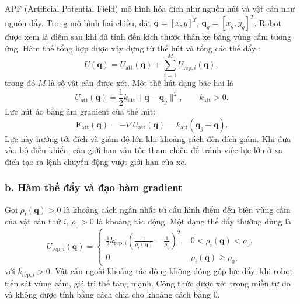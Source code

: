 \documentclass[12pt,a4paper,oneside]{report}
\begin{document}
APF (Artificial Potential Field) mô hình hóa đích như nguồn hút và vật cản như nguồn đẩy. Trong mô hình hai chiều, đặt \(\mathbf{q}=[x,y]^{T}\), \(\mathbf{q}_g=[x_g,y_g]^{T}\). Robot được xem là điểm sau khi đã tính đến kích thước thân xe bằng vùng cấm tương ứng. Hàm thế tổng hợp được xây dựng từ thế hút và tổng các thế đẩy \cite{khatib-apf-1986}:
\begin{equation}
  U(\mathbf{q})=U_{\mathrm{att}}(\mathbf{q})
    +\sum_{i=1}^{M}U_{\mathrm{rep},i}(\mathbf{q}),
  \label{eq:apf-potential}
\end{equation}
trong đó \(M\) là số vật cản được xét. Một thế hút dạng bậc hai là
\begin{equation}
  U_{\mathrm{att}}(\mathbf{q})
    =\frac{1}{2}k_{\mathrm{att}}\|\mathbf{q}-\mathbf{q}_g\|^{2},
  \qquad k_{\mathrm{att}}>0.
\end{equation}
Lực hút ảo bằng âm gradient của thế hút:
\begin{equation}
  \mathbf{F}_{\mathrm{att}}(\mathbf{q})
    =-\nabla U_{\mathrm{att}}(\mathbf{q})
    =k_{\mathrm{att}}(\mathbf{q}_g-\mathbf{q}).
  \label{eq:apf-attractive-force}
\end{equation}
Lực này hướng tới đích và giảm độ lớn khi khoảng cách đến đích giảm. Khi đưa vào bộ điều khiển, cần giới hạn vận tốc tham chiếu để tránh việc lực lớn ở xa đích tạo ra lệnh chuyển động vượt giới hạn của xe.

\subsubsection*{b. Hàm thế đẩy và đạo hàm gradient}

Gọi \(\rho_i(\mathbf{q})>0\) là khoảng cách ngắn nhất từ cấu hình điểm đến biên vùng cấm của vật cản thứ \(i\), \(\rho_0>0\) là khoảng tác động. Một dạng thế đẩy thường dùng là
\begin{equation}
  U_{\mathrm{rep},i}(\mathbf{q})=
  \begin{cases}
    \displaystyle\frac{1}{2}k_{\mathrm{rep},i}
      \left(\frac{1}{\rho_i(\mathbf{q})}-\frac{1}{\rho_0}\right)^{2},
      &0<\rho_i(\mathbf{q})<\rho_0,\\[6pt]
    0,&\rho_i(\mathbf{q})\geq\rho_0,
  \end{cases}
  \label{eq:apf-repulsive-potential}
\end{equation}
với \(k_{\mathrm{rep},i}>0\). Vật cản ngoài khoảng tác động không đóng góp lực đẩy; khi robot tiến sát vùng cấm, giá trị thế tăng mạnh. Công thức được xét trong miền tự do và không được tính bằng cách chia cho khoảng cách bằng \(0\).
\end{document}
